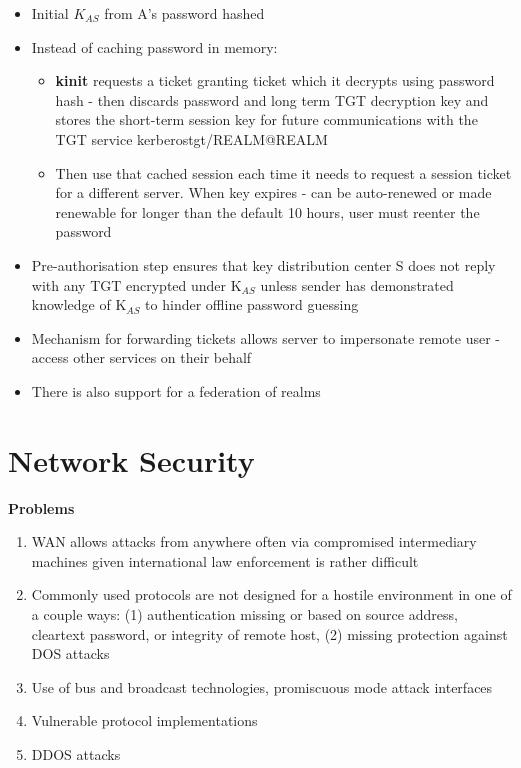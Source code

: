 \documentclass{article}
\newenvironment{cons}{\par\color{red}}{\par}
\begin{document}
\begin{itemize}
	\item Initial $K_{AS}$ from A's password hashed
	\item Instead of caching password in memory:
	\begin{itemize}
		\item \textbf{kinit} requests a ticket granting ticket which it decrypts using password hash - then discards password and long term TGT decryption key and stores the short-term session key for future communications with the TGT service kerberostgt/REALM@REALM
		\item Then use that cached session each time it needs to request a session ticket for a different server. When key expires - can be auto-renewed or made renewable for longer than the default 10 hours, user must reenter the password
	\end{itemize}

	\item Pre-authorisation step ensures that key distribution center S does not reply with any TGT encrypted under K$_{AS}$ unless sender has demonstrated knowledge of K$_{AS}$ to hinder offline password guessing
	
	\item Mechanism for forwarding tickets allows server to impersonate remote user - access other services on their behalf
	
	\item There is also support for a federation of realms
	
\end{itemize}



\section{Network Security}
\begin{cons}
\textbf{Problems}
\begin{enumerate}
	\item WAN allows attacks from anywhere often via compromised intermediary machines given international law enforcement is rather difficult
	\item Commonly used protocols are not designed for a hostile environment in one of a couple ways: (1) authentication missing or based on source address, cleartext password, or integrity of remote host, (2) missing protection against DOS attacks
	\item Use of bus and broadcast technologies, promiscuous mode attack interfaces
	\item Vulnerable protocol implementations
	\item DDOS attacks
\end{enumerate}
\end{cons}
\end{document}
